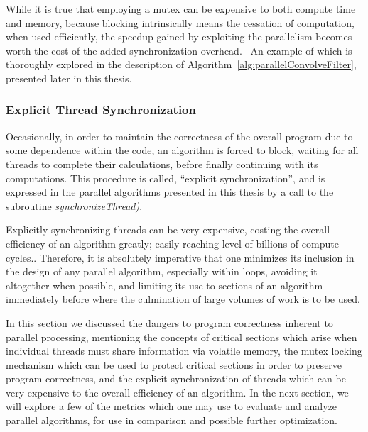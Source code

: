 While it is true that employing a mutex can be expensive to both compute time and memory, because blocking intrinsically means the cessation of computation, when used efficiently, the speedup gained by exploiting the parallelism becomes worth the cost of the added synchronization overhead.~\cite[~p.20]{Lang17} An example of which is thoroughly explored in the description of Algorithm~\ref{alg:parallelConvolveFilter}, presented later in this thesis.

%
%
\subsubsection{Explicit Thread Synchronization}
\label{ch2sPPssPCsssETS}
Occasionally, in order to maintain the correctness of the overall program due to some dependence within the code, an algorithm is forced to block, waiting for all threads to complete their calculations, before finally continuing with its computations. This procedure is called, ``explicit synchronization'', and is expressed in the parallel algorithms presented in this thesis by a call to the subroutine \textit{synchronizeThread)}.

Explicitly synchronizing threads can be very expensive, costing the overall efficiency of an algorithm greatly; easily reaching level of  billions of compute cycles.. Therefore, it is absolutely imperative that one minimizes its inclusion in the design of any parallel algorithm, especially within loops, avoiding it altogether when possible, and limiting its use to sections of an algorithm immediately before where the culmination of large volumes of work is to be used.

In this section we discussed the dangers to program correctness inherent to parallel processing, mentioning the concepts of critical sections which arise when individual threads must share information via volatile memory, the mutex locking mechanism which can be used to protect critical sections in order to preserve program correctness, and the explicit synchronization of threads which can be very expensive to the overall efficiency of an algorithm. In the next section, we will explore a few of the metrics which one may use to evaluate and analyze parallel algorithms, for use in comparison and possible further optimization. 

